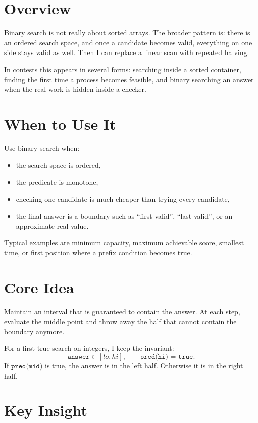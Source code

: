 \section*{Overview}

Binary search is not really about sorted arrays. The broader pattern is: there is an ordered search space, and once a
candidate becomes valid, everything on one side stays valid as well. Then I can replace a linear scan with repeated
halving.

In contests this appears in several forms: searching inside a sorted container, finding the first time a process
becomes feasible, and binary searching an answer when the real work is hidden inside a checker.

\section*{When to Use It}

Use binary search when:

\begin{itemize}
  \item the search space is ordered,
  \item the predicate is monotone,
  \item checking one candidate is much cheaper than trying every candidate,
  \item the final answer is a boundary such as ``first valid'', ``last valid'', or an approximate real value.
\end{itemize}

Typical examples are minimum capacity, maximum achievable score, smallest time, or first position where a prefix
condition becomes true.

\section*{Core Idea}

Maintain an interval that is guaranteed to contain the answer. At each step, evaluate the middle point and throw away
the half that cannot contain the boundary anymore.

For a first-true search on integers, I keep the invariant:
\[
\texttt{answer} \in [lo, hi], \qquad \texttt{pred(hi) = true}.
\]
If \(\texttt{pred(mid)}\) is true, the answer is in the left half. Otherwise it is in the right half.

\section*{Key Insight}

